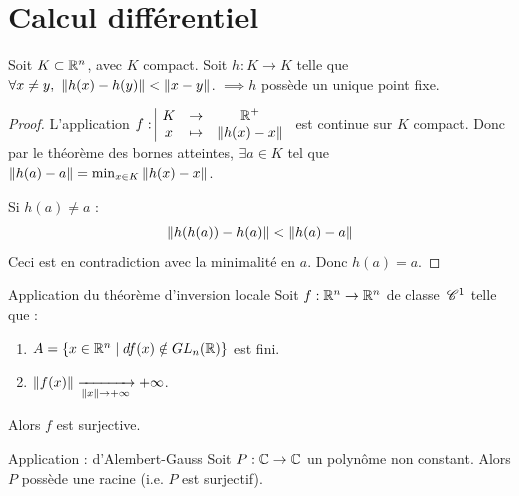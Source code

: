 \section{Calcul différentiel}

\begin{theorement}{}
    Soit $K \subset \mathbb{R}^n$, avec $K$ compact.
    Soit $h : K \to K$ telle que $\forall x \neq y, \ \left\|h(x) - h(y)\right\| < \left\|x - y\right\|$.
    $\implies h$ possède un unique point fixe.
\end{theorement}

\begin{proof}
    L'application $f: \space \begin{array}{|ccc} \displaystyle K & \to & \displaystyle \mathbb{R}^+ \\ \displaystyle x & \mapsto & \displaystyle \left\|h(x) - x\right\| \end{array}$ est continue sur $K$ compact.
    Donc par le théorème des bornes atteintes, $\exists a \in K$ tel que $\left\|h(a) - a\right\| = \min_{x \in K} \left\|h(x) - x\right\|$.
    
    Si $h(a) \neq a$ :
    \[
    \left\|h(h(a)) - h(a)\right\| < \left\|h(a) - a\right\|
    \]
    Ceci est en contradiction avec la minimalité en $a$. 
    Donc $h(a) = a$.
\end{proof}

\begin{theoreme}{Application du théorème d'inversion locale}{}
    Soit $f : \mathbb{R}^n \to \mathbb{R}^n$ de classe $\,\mathscr C^{1}$ telle que :
    \begin{enumerate}
        \item $A = \{x \in \mathbb{R}^n \mid df(x) \notin GL_n(\mathbb{R})\}$ est fini.
        \item $\left\|f(x)\right\| \xrightarrow[\left\|x\right\| \to +\infty]{} +\infty$.
    \end{enumerate}
    Alors $f$ est surjective.
\end{theoreme}

\begin{theoreme}{Application : d'Alembert-Gauss}{}
    Soit $P : \mathbb{C} \to \mathbb{C}$ un polynôme non constant.
    Alors $P$ possède une racine (i.e. $P$ est surjectif).
\end{theoreme}

